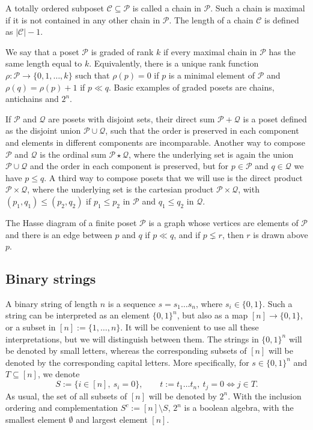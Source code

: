 \documentclass[12pt]{article}
\theoremstyle{definition}
\theoremstyle{remark}
\def\cover{\ll}
\def\Ce{\mathcal C}
\def\Pe{\mathcal P}
\begin{document}
A totally ordered subposet $\Ce\subseteq \Pe$ is called a chain in $\Pe$. Such a chain  is
maximal if it is not contained in any other chain in $\Pe$.
The length of a chain $\Ce$ is defined as $|\Ce|-1$. 

We say that a poset $\Pe$  is graded of rank
$k$ if every maximal chain in $\Pe$ has the same length equal to $k$. Equivalently,  there is
a unique rank function $\rho: \Pe\to \{0,1,\dots,k\}$ such that $\rho(p)=0$ if $p$ is a
minimal element of $\Pe$ and $\rho(q)=\rho(p)+1$ if $p\cover q$. Basic examples of graded
posets are chains, antichains and $2^n$.


If $\Pe$ and $\mathcal Q$ are posets with disjoint sets, their direct sum $\Pe+\mathcal Q$ is a poset defined as 
the disjoint union $\Pe\cup \mathcal Q$, such that the order is preserved in each
component and elements in different components are incomparable. 
 Another way to compose
$\Pe$ and $\mathcal Q$ is the ordinal sum $\Pe\star \mathcal Q$, where the underlying set
is again the union $\Pe\cup \mathcal Q$ and the order in each component is preserved, but
for $p\in \Pe$ and $q\in \mathcal Q$ we have $p\le q$. A third way to compose posets that
we will use is the direct product $\Pe\times \mathcal Q$, where the underlying set is the
cartesian product $\Pe\times \mathcal Q$, with $(p_1,q_1)\le (p_2,q_2)$ if $p_1\le p_2$ in
$\Pe$  and $q_1\le q_2$ in $\mathcal Q$. 

The Hasse diagram of a finite poset $\Pe$ is a graph whose vertices are elements of $\Pe$
and there is an edge between $p$ and $q$ if $p\cover q$, and if $p\lneq r$, then $r$ is drawn above
$p$. 


\subsection{Binary strings}

A binary string of length $n$ is a sequence  $s=s_1\dots s_n$, where $s_i\in
\{0,1\}$. Such a string can be interpreted as an element $\{0,1\}^n$, but also as a 
map $[n]\to \{0,1\}$, or a subset in  $[n]:=\{1,\dots,n\}$. It will be convenient to use
all these interpretations, but we will distinguish between them. The strings in
$\{0,1\}^n$ will be denoted by small letters, whereas the corresponding subsets of $[n]$
will be denoted by the corresponding capital letters. More specifically, for $s\in \{0,1\}^n$ and 
$T\subseteq [n]$, we denote
\begin{equation}\label{eq:string_subset}
S:=\{i\in [n],\ s_i=0\},\qquad t:=t_1\dots t_n,\ t_j=0 \iff j\in T.
\end{equation}
As usual, the set of all subsets of $[n]$ will be denoted by $2^n$. 
With the inclusion ordering and complementation $S^c:=[n]\setminus S$,
$2^n$ is a boolean algebra, with the smallest element $\emptyset$ and largest element
$[n]$.  
\end{document}
